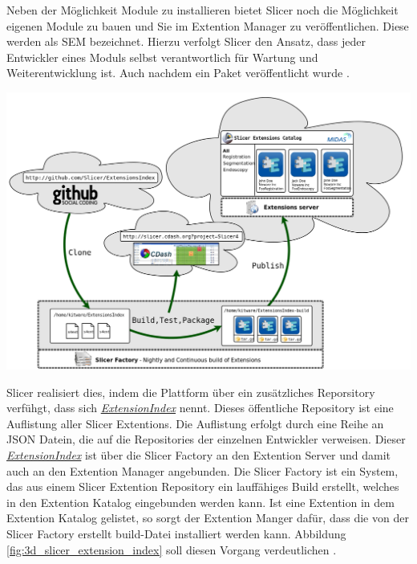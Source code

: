 \begin{minipage}{0.30\textwidth}
	Neben der Möglichkeit Module zu installieren bietet Slicer noch die Möglichkeit
	eigenen Module zu bauen und Sie im Extention Manager zu veröffentlichen. Diese
	werden als \ac{SEM} bezeichnet. Hierzu verfolgt Slicer den Ansatz, dass jeder Entwickler
	eines Moduls selbst verantwortlich für Wartung und Weiterentwicklung ist. Auch
	nachdem ein Paket veröffentlicht wurde \citep{slicer2024}.
\end{minipage}
\hfill
\begin{minipage}{0.60\textwidth}
	\centering
	\includegraphics[width=1\textwidth]{img/slicer_extention_index.png}
	\label{fig:3d_slicer_extension_index}
\end{minipage}

Slicer realisiert dies, indem die Plattform über ein zusätzliches Reporsitory verfühgt,
dass sich
\href{https://github.com/Slicer/ExtensionsIndex?tab=readme-ov-file}{\textit{ExtensionIndex}}
nennt. Dieses öffentliche Repository ist eine Auflistung aller Slicer Extentions.
Die Auflistung erfolgt durch eine Reihe an \ac{JSON} Datein, die auf die
Repositories der einzelnen Entwickler verweisen. Dieser \href{https://github.com/Slicer/ExtensionsIndex?tab=readme-ov-file}{\textit{ExtensionIndex}}
ist über die Slicer Factory an den Extention Server und damit auch an den Extention
Manager angebunden. Die Slicer Factory ist ein System, das aus einem Slicer Extention
Repository ein lauffähiges Build erstellt, welches in den Extention Katalog
eingebunden werden kann. Ist eine Extention in dem Extention Katalog gelistet,
so sorgt der Extention Manger dafür, dass die von der Slicer Factory erstellt build-Datei
installiert werden kann. Abbildung \ref{fig:3d_slicer_extension_index} soll
diesen Vorgang verdeutlichen \citep[vgl.][]{slicer2024}.

